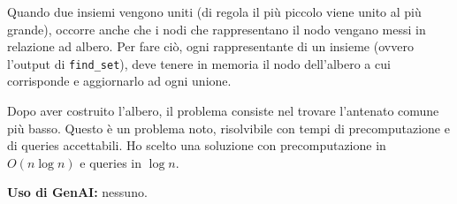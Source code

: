 \documentclass[a4paper]{article}
\begin{document}
Quando due insiemi vengono uniti (di regola il più piccolo viene unito al più grande), occorre anche che i nodi che rappresentano il nodo vengano messi in relazione ad albero. Per fare ciò, ogni rappresentante di un insieme (ovvero l'output di \texttt{find\_set}), deve tenere in memoria il nodo dell'albero a cui corrisponde e aggiornarlo ad ogni unione.

Dopo aver costruito l'albero, il problema consiste nel trovare l'antenato comune più basso. Questo è un problema noto, risolvibile con tempi di precomputazione e di queries accettabili. Ho scelto una soluzione con precomputazione in $O(n\log n)$ e queries in $\log n$.


\bigskip
\bigskip
\bigskip
\bigskip
\bigskip
\bigskip



{\bf Uso di GenAI:} nessuno.
\end{document}
